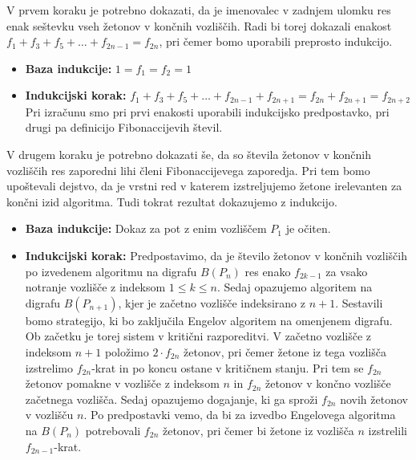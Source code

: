 \documentclass[twoside,11pt]{article}
\begin{document}
\begin{dokaz}
V prvem koraku je potrebno dokazati, da je imenovalec v zadnjem ulomku res enak seštevku vseh žetonov v končnih vozliščih. 
Radi bi torej dokazali enakost $f_1+f_3+f_5+\ldots+f_{2n-1}=f_{2n}$, pri čemer bomo uporabili preprosto indukcijo.
\begin{itemize}
    \item [] \textbf{Baza indukcije:} \quad $1=f_1=f_2=1$
    \item [] \textbf{Indukcijski korak:} \quad $f_1+f_3+f_5+\ldots+f_{2n-1}+f_{2n+1} = f_{2n} + f_{2n+1} = f_{2n+2}$ \\
    Pri izračunu smo pri prvi enakosti uporabili indukcijsko predpostavko, pri drugi pa definicijo Fibonaccijevih števil.
\end{itemize}

\noindent V drugem koraku je potrebno dokazati še, da so števila žetonov v končnih vozliščih res zaporedni lihi členi
Fibonaccijevega zaporedja. Pri tem bomo upoštevali dejstvo, da je vrstni red v katerem izstreljujemo žetone irelevanten za končni izid algoritma.
Tudi tokrat rezultat dokazujemo z indukcijo.
\begin{itemize}
    \item [] \textbf{Baza indukcije:} Dokaz za pot z enim vozliščem $P_1$ je očiten.
    \item [] \textbf{Indukcijski korak:} Predpostavimo, da je število žetonov v končnih vozliščih po izvedenem algoritmu na 
    digrafu $B(P_{n})$ res enako $f_{2k-1}$ za vsako notranje vozlišče z indeksom $1\le k\le n$. 
    Sedaj opazujemo algoritem na digrafu $B(P_{n+1})$, kjer je začetno vozlišče indeksirano z $n+1$. Sestavili bomo strategijo, 
    ki bo zaključila Engelov algoritem na omenjenem digrafu. Ob začetku je torej sistem v kritični razporeditvi.
    V začetno vozlišče z indeksom $n+1$ položimo $2\cdot f_{2n}$ žetonov, pri čemer žetone iz tega vozlišča izstrelimo $f_{2n}$-krat in 
    po koncu ostane v kritičnem stanju. Pri tem se $f_{2n}$ žetonov pomakne v vozlišče z indeksom $n$ in $f_{2n}$ žetonov v končno vozlišče začetnega vozlišča.
    Sedaj opazujemo dogajanje, ki ga sproži $f_{2n}$ novih žetonov v vozlišču $n$. Po predpostavki vemo, da bi za izvedbo Engelovega algoritma na $B(P_{n})$ potrebovali $f_{2n}$ žetonov, pri čemer bi žetone iz vozlišča $n$ izstrelili $f_{2n-1}$-krat. 

\end{itemize}
\end{dokaz}
\end{document}
